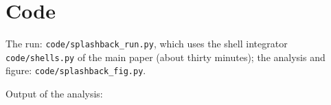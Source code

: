 \documentclass[11pt,a4paper]{article}
\begin{document}
\appendix
\section{Code}
The run: \texttt{code/splashback\_run.py}, which uses the shell
integrator \texttt{code/shells.py} of the main paper (about thirty
minutes); the analysis and figure: \texttt{code/splashback\_fig.py}.


Output of the analysis:

\end{document}
